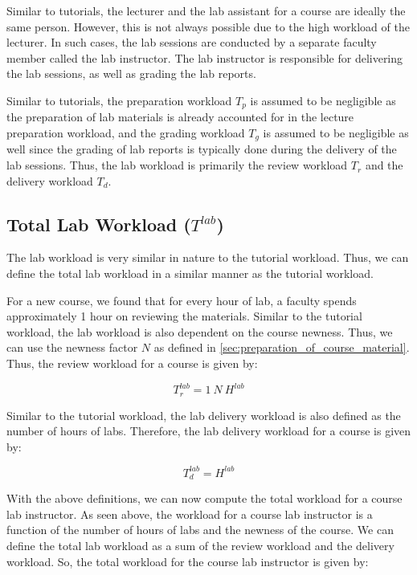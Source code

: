 Similar to tutorials, the lecturer and the lab assistant for a course are ideally the same person. However, this is not always possible due to the high workload of the lecturer. In such cases, the lab sessions are conducted by a separate faculty member called the lab instructor. The lab instructor is responsible for delivering the lab sessions, as well as grading the lab reports.

Similar to tutorials, the preparation workload \(T_p\) is assumed to be negligible as the preparation of lab materials is already accounted for in the lecture preparation workload, and the grading workload \(T_g\) is assumed to be negligible as well since the grading of lab reports is typically done during the delivery of the lab sessions. Thus, the lab workload is primarily the review workload \(T_r\) and the delivery workload \(T_d\).

\subsection{Total Lab Workload (\(T^{lab}\))}

The lab workload is very similar in nature to the tutorial workload. Thus, we can define the total lab workload in a similar manner as the tutorial workload.

For a new course, we found that for every hour of lab, a faculty spends approximately 1 hour on reviewing the materials. Similar to the tutorial workload, the lab workload is also dependent on the course newness. Thus, we can use the newness factor \(N\) as defined in \autoref{sec:preparation_of_course_material}. Thus, the review workload for a course is given by:

\begin{equation}
  \label{eqn:lab-review-workload}
  T_r^{lab} = 1\ N \ H^{lab}
\end{equation}

Similar to the tutorial workload, the lab delivery workload is also defined as the number of hours of labs. Therefore, the lab delivery workload for a course is given by:

\begin{equation}
  \label{eqn:lab-delivery-workload}
  T_d^{lab} = H^{lab}
\end{equation}

With the above definitions, we can now compute the total workload for a course lab instructor. As seen above, the workload for a course lab instructor is a function of the number of hours of labs and the newness of the course. We can define the total lab workload as a sum of the review workload and the delivery workload. So, the total workload for the course lab instructor is given by:


